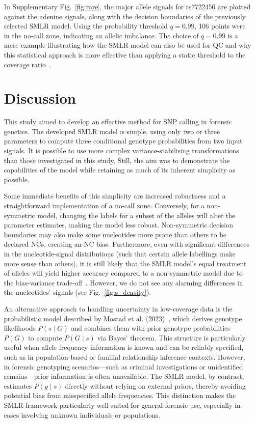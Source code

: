 \documentclass[preprint,5p,times,11pt]{elsarticle}
\begin{document}
In Supplementary Fig.~\ref{fig:rare}, the major allele signals for rs7722456 are plotted against the adenine signals, along with the decision boundaries of the previously selected SMLR model.
Using the probability threshold $q=0.99$, 106 points were in the no-call zone, indicating an allelic imbalance.
The choice of $q=0.99$ is a mere example illustrating how the SMLR model can also be used for QC and why this statistical approach is more effective than applying a static threshold to the coverage ratio~\cite[p.~35]{hid}.



\section{Discussion}
This study aimed to develop an effective method for SNP calling in forensic genetics.
The developed SMLR model is simple, using only two or three parameters to compute three conditional genotype probabilities from two input signals.
It is possible to use more complex variance-stabilising transformations than those investigated in this study.
Still, the aim was to demonstrate the capabilities of the model while retaining as much of its inherent simplicity as possible.

Some immediate benefits of this simplicity are increased robustness and a straightforward implementation of a no-call zone.
Conversely, for a non-symmetric model, changing the labels for a subset of the alleles will alter the parameter estimates, making the model less robust.
Non-symmetric decision boundaries may also make some nucleotides more prone than others to be declared NCs, creating an NC bias.
Furthermore, even with significant differences in the nucleotide-signal distributions (such that certain allele labellings make more sense than others), it is still likely that the SMLR model's equal treatment of alleles will yield higher accuracy compared to a non-symmetric model due to the bias-variance trade-off~\cite{shmueli}.
However, we do not see any alarming differences in the nucleotides' signals (see Fig.~\ref{fig:s_density}).


An alternative approach to handling uncertainty in low-coverage data is the probabilistic model described by Mostad et al. (2023)~\cite{mostad}, which derives genotype likelihoods $P(s \mid G)$ and combines them with prior genotype probabilities $P(G)$ to compute $P(G \mid s)$ via Bayes’ theorem.
This structure is particularly useful when allele frequency information is known and can be reliably specified, such as in population-based or familial relationship inference contexts.
However, in forensic genotyping scenarios---such as criminal investigations or unidentified remains---prior information is often unavailable.
The SMLR model, by contrast, estimates $P(g \mid s)$ directly without relying on external priors, thereby avoiding potential bias from misspecified allele frequencies.
This distinction makes the SMLR framework particularly well-suited for general forensic use, especially in cases involving unknown individuals or populations.
\end{document}
